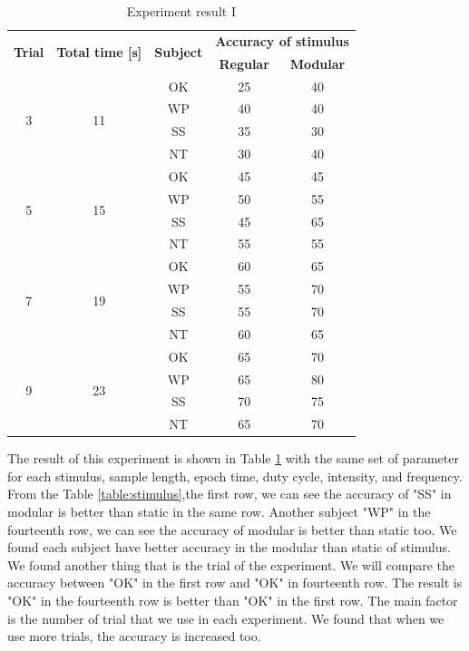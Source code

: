 \begin{table}[ht]
\centering
\begin{tabular}{| c | c | c | c | c |}

			\hline 
			\multirow{2}{*}{\textbf{Trial}} & 
  			\multirow{2}{*}{\textbf{Total time [s]}}  & 
            \multirow{2}{*}{\textbf{Subject}} &
            \multicolumn{2}{c|}{\textbf{Accuracy of stimulus}} \\
            \cline{4-5}
            &&&\multicolumn{1}{c|}{\textbf{Regular}} &\multicolumn{1}{c|}{\textbf{Modular}}  \\
			\hline 
			\multirow{4}{*}{3}&\multirow{4}{*}{11}&OK&25&40 \\
			\cline{3-5}
			&&WP&40&40 \\ \cline{3-5}
			&&SS&35&30 \\ \cline{3-5}
			&&NT&30&40 \\
            \hline
			\multirow{4}{*}{5}&\multirow{4}{*}{15}&OK&45&45 \\
			\cline{3-5}
			&&WP&50&55 \\ \cline{3-5}
			&&SS&45&65 \\ \cline{3-5}
			&&NT&55&55 \\
            \hline
            \multirow{4}{*}{7}&\multirow{4}{*}{19}&OK&60&65 \\
			\cline{3-5}
			&&WP&55&70 \\ \cline{3-5}
			&&SS&55&70 \\ \cline{3-5}
			&&NT&60&65 \\
            \hline 
            \multirow{4}{*}{9}&\multirow{4}{*}{23}&OK&65&70 \\
			\cline{3-5}
			&&WP&65&80 \\ \cline{3-5}
			&&SS&70&75 \\ \cline{3-5}
			&&NT&65&70 \\
            \hline 
		\end{tabular}       
\caption{Experiment result I}
\label{table:result1}
\end{table}

The result of this experiment is shown in Table \ref{table:result1} with the same set of parameter for each stimulus, sample length, epoch time, duty cycle, intensity, and frequency. From the Table \ref{table:stimulus},the first row, we can see the accuracy of "SS" in modular is better than static in the same row. Another subject "WP" in the fourteenth row, we can see the accuracy of modular is better than static too. We found each subject have better accuracy in the modular than static of stimulus. We found another thing that is the trial of the experiment. We will compare the accuracy between "OK" in the first row and "OK" in fourteenth row. The result is "OK" in the fourteenth row is better than "OK" in the first row. The main factor is the number of trial that we use in each experiment. We found that when we use more trials, the accuracy is increased too.

